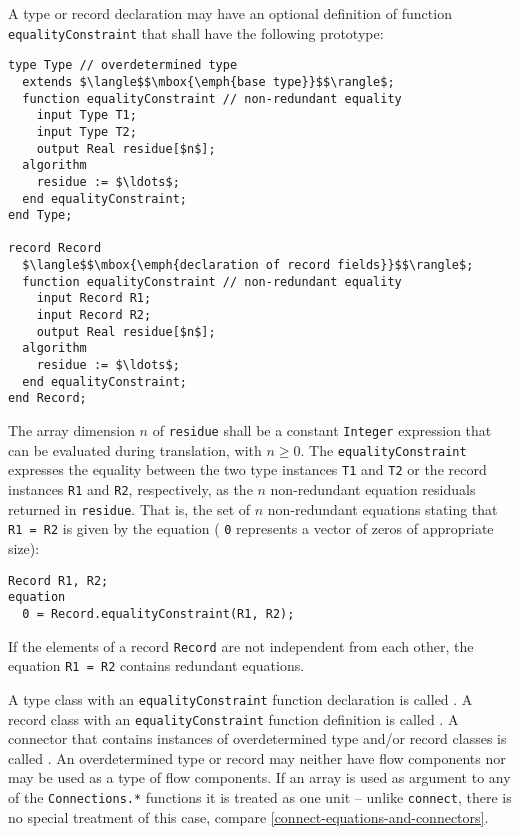 A type or record declaration may have an optional definition of function \lstinline!equalityConstraint! that shall have the following prototype:
\begin{lstlisting}[language=modelica]
type Type // overdetermined type
  extends $\langle$$\mbox{\emph{base type}}$$\rangle$;
  function equalityConstraint // non-redundant equality
    input Type T1;
    input Type T2;
    output Real residue[$n$];
  algorithm
    residue := $\ldots$;
  end equalityConstraint;
end Type;

record Record
  $\langle$$\mbox{\emph{declaration of record fields}}$$\rangle$;
  function equalityConstraint // non-redundant equality
    input Record R1;
    input Record R2;
    output Real residue[$n$];
  algorithm
    residue := $\ldots$;
  end equalityConstraint;
end Record;
\end{lstlisting}
The array dimension $n$ of \lstinline!residue! shall be a constant \lstinline!Integer! expression that can be evaluated during translation, with $n \geq 0$.
The \lstinline!equalityConstraint! expresses the equality between the two type instances \lstinline!T1! and \lstinline!T2! or the record instances \lstinline!R1! and \lstinline!R2!, respectively, as the $n$ non-redundant equation residuals returned in \lstinline!residue!.
That is, the set of $n$ non-redundant equations stating that \lstinline!R1 = R2! is given by the equation (%
\ifpdf
\lstinline!0!
\fi
represents a vector of zeros of appropriate size):
\begin{lstlisting}[language=modelica]
  Record R1, R2;
equation
  0 = Record.equalityConstraint(R1, R2);
\end{lstlisting}
\begin{nonnormative}
If the elements of a record \lstinline!Record! are not independent from each other, the equation \lstinline!R1 = R2! contains redundant equations.
\end{nonnormative}

A type class with an \lstinline!equalityConstraint! function declaration is called .
A record class with an \lstinline!equalityConstraint! function definition is called .
A connector that contains instances of overdetermined type and/or record classes is called .
An overdetermined type or record may neither have flow components nor may be used as a type of flow components.
If an array is used as argument to any of the \lstinline!Connections.*! functions it is treated as one unit -- unlike \lstinline!connect!, there is no special treatment of this case, compare \cref{connect-equations-and-connectors}.

